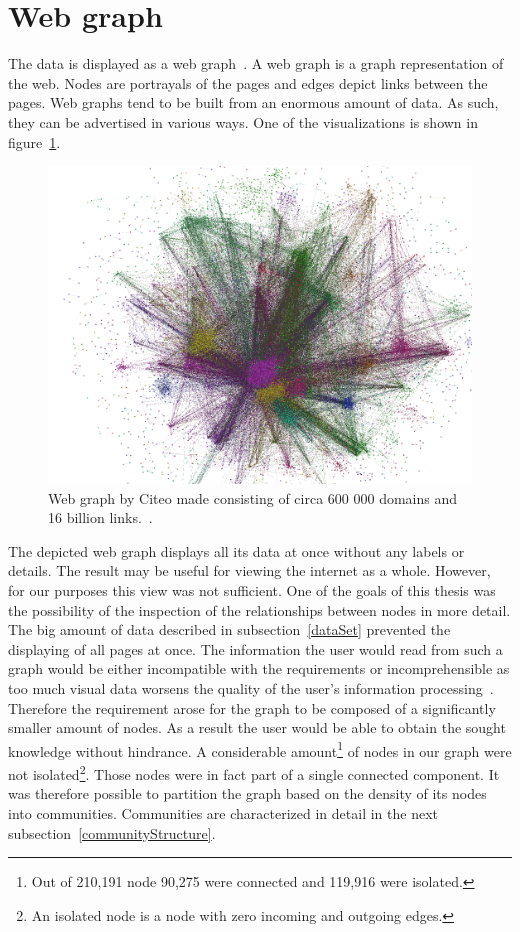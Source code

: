 \section{Web graph} \label{webGraph}
The data is displayed as a web graph~\cite{the_web_graph_overview}. A web graph is a graph representation of the web. Nodes are portrayals of the pages and edges depict links between the pages. Web graphs tend to be built from an enormous amount of data. As such, they can be advertised in various ways. One of the visualizations is shown in figure~\ref{hugeWebGraphFireworks}. 
\begin{figure}[ht!]
  \centering
  \includegraphics[width=\textwidth]{Images/hugeWebGraphFireworks.png}
  \caption{Web graph by Citeo made consisting of circa 600 000 domains and 16 billion links.~\cite{hugeWebGraphFireworks}.}
  \label{hugeWebGraphFireworks}
\end{figure} 
The depicted web graph displays all its data at once without any labels or details. The result may be useful for viewing the internet as a whole. However, for our purposes this view was not sufficient. One of the goals of this thesis was the possibility of the inspection of the relationships between nodes in more detail. The big amount of data described in subsection~\ref{dataSet} prevented the displaying of all pages at once. The information the user would read from such a graph would be either incompatible with the requirements or incomprehensible as too much visual data worsens the quality of the user's information processing~\cite{informationCluttering}. Therefore the requirement arose for the graph to be composed of a significantly smaller amount of nodes. As a result the user would be able to obtain the sought knowledge without hindrance. A considerable amount\footnote{Out of 210,191 node 90,275 were connected and 119,916 were isolated.} of nodes in our graph were not isolated\footnote{An isolated node is a node with zero incoming and outgoing edges.}. Those nodes were in fact part of a single connected component. It was therefore possible to partition the graph based on the density of its nodes into communities. Communities are characterized in detail in the next subsection~\ref{communityStructure}.

